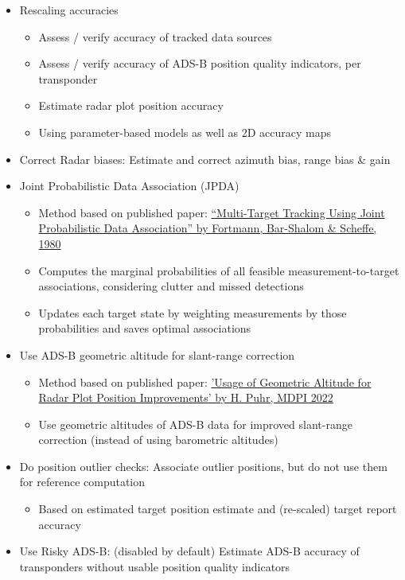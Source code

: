\begin{itemize}
\item Rescaling accuracies
\begin{itemize}
\item Assess / verify accuracy of tracked data sources
\item Assess / verify accuracy of ADS-B position quality indicators, per transponder
\item Estimate radar plot position accuracy
\item Using parameter-based models as well as 2D accuracy maps
\end{itemize}
\item Correct Radar biases: Estimate and correct azimuth bias, range bias \& gain
\item Joint Probabilistic Data Association (JPDA)
\begin{itemize}
\item Method based on published paper: \href{https://doi.org/10.1109/CDC.1980.271915}{“Multi-Target Tracking Using Joint Probabilistic Data Association” by Fortmann, Bar-Shalom \& Scheffe, 1980}
\item Computes the marginal probabilities of all feasible measurement-to-target associations, considering clutter and missed detections
\item Updates each target state by weighting measurements by those probabilities and saves optimal associations
\end{itemize}
\item Use ADS-B geometric altitude for slant-range correction
\begin{itemize}
\item Method based on published paper: \href{https://doi.org/10.3390/engproc2022028008}{'Usage of Geometric Altitude for Radar Plot Position Improvements' by H. Puhr, MDPI 2022}
\item Use geometric altitudes of ADS-B data for improved slant-range correction (instead of using barometric altitudes)
\end{itemize}
\item Do position outlier checks: Associate outlier positions, but do not use them for reference computation
\begin{itemize}
\item Based on estimated target position estimate and (re-scaled) target report accuracy
\end{itemize}
\item Use Risky ADS-B: (disabled by default) Estimate ADS-B accuracy of transponders without usable position quality indicators

\end{itemize}
